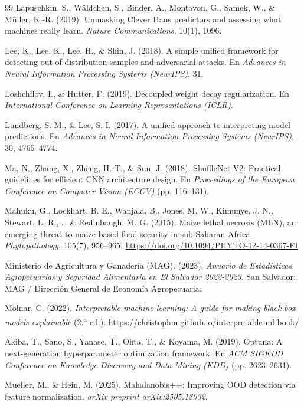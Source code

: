 \begin{singlespace}
\begin{thebibliography}{99}
Lapuschkin, S., W\"aldchen, S., Binder, A., Montavon, G., Samek, W., \& M\"uller, K.-R. (2019). Unmasking Clever Hans predictors and assessing what machines really learn. \textit{Nature Communications}, 10(1), 1096.

Lee, K., Lee, K., Lee, H., \& Shin, J. (2018). A simple unified framework for detecting out-of-distribution samples and adversarial attacks. En \textit{Advances in Neural Information Processing Systems (NeurIPS)}, 31.

Loshchilov, I., \& Hutter, F. (2019). Decoupled weight decay regularization. En \textit{International Conference on Learning Representations (ICLR)}.

Lundberg, S. M., \& Lee, S.-I. (2017). A unified approach to interpreting model predictions. En \textit{Advances in Neural Information Processing Systems (NeurIPS)}, 30, 4765--4774.

Ma, N., Zhang, X., Zheng, H.-T., \& Sun, J. (2018). ShuffleNet V2: Practical guidelines for efficient CNN architecture design. En \textit{Proceedings of the European Conference on Computer Vision (ECCV)} (pp. 116--131).

Mahuku, G., Lockhart, B. E., Wanjala, B., Jones, M. W., Kimunye, J. N., Stewart, L. R., \ldots{} \& Redinbaugh, M. G. (2015). Maize lethal necrosis (MLN), an emerging threat to maize-based food security in sub-Saharan Africa. \textit{Phytopathology}, 105(7), 956--965. \url{https://doi.org/10.1094/PHYTO-12-14-0367-FI}

Ministerio de Agricultura y Ganader\'ia (MAG). (2023). \textit{Anuario de Estad\'isticas Agropecuarias y Seguridad Alimentaria en El Salvador 2022-2023}. San Salvador: MAG / Direcci\'on General de Econom\'ia Agropecuaria.

Molnar, C. (2022). \textit{Interpretable machine learning: A guide for making black box models explainable} (2.\textsuperscript{a} ed.). \url{https://christophm.github.io/interpretable-ml-book/}

Akiba, T., Sano, S., Yanase, T., Ohta, T., \& Koyama, M. (2019). Optuna: A next-generation hyperparameter optimization framework. En \textit{ACM SIGKDD Conference on Knowledge Discovery and Data Mining (KDD)} (pp. 2623--2631).

Mueller, M., \& Hein, M. (2025). Mahalanobis++: Improving OOD detection via feature normalization. \textit{arXiv preprint arXiv:2505.18032}.


\end{thebibliography}
\end{singlespace}
